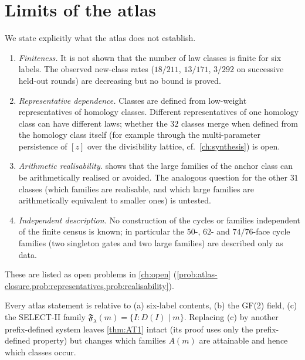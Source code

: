 \section{Limits of the atlas}
We state explicitly what the atlas does not establish.
\begin{enumerate}[label=(\roman*)]
\item \emph{Finiteness.} It is not shown that the number of law classes is finite for six labels. The observed new-class rates ($18/211$, $13/171$, $3/292$ on successive held-out rounds) are decreasing but no bound is proved.
\item \emph{Representative dependence.} Classes are defined from low-weight representatives of homology classes. Different representatives of one homology class can have different laws; whether the $32$ classes merge when defined from the homology class itself (for example through the multi-parameter persistence of $[z]$ over the divisibility lattice, cf.\ \cref{ch:synthesis}) is open.
\item \emph{Arithmetic realisability.}  shows that the large families of the anchor class can be arithmetically realised or avoided. The analogous question for the other $31$ classes (which families are realisable, and which large families are arithmetically equivalent to smaller ones) is untested.
\item \emph{Independent description.} No construction of the cycles or families independent of the finite census is known; in particular the $50$-, $62$- and $74/76$-face cycle families (two singleton gates and two large families) are described only as data.
\end{enumerate}
These are listed as open problems in \cref{ch:open} (\cref{prob:atlas-closure,prob:representatives,prob:realisability}).
\begin{proposition}\label{prop:atlas-scope}
Every atlas statement is relative to (a) six-label contents, (b) the GF(2) field, (c) the SELECT-II family $\mathfrak F_\lambda(m)=\{I:D(I)\mid m\}$. Replacing (c) by another prefix-defined system leaves \cref{thm:AT1} intact (its proof uses only the prefix-defined property) but changes which families $A(m)$ are attainable and hence which classes occur.
\end{proposition}
